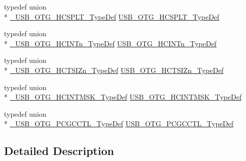 \begin{DoxyCompactItemize}
\item 
typedef union \\*
\hyperlink{union___u_s_b___o_t_g___h_c_s_p_l_t___type_def}{\-\_\-\-U\-S\-B\-\_\-\-O\-T\-G\-\_\-\-H\-C\-S\-P\-L\-T\-\_\-\-Type\-Def} \hyperlink{group______otg___core__registers_ga8f4ca4c1a354053dc90106d929d669d0}{U\-S\-B\-\_\-\-O\-T\-G\-\_\-\-H\-C\-S\-P\-L\-T\-\_\-\-Type\-Def}
\item 
typedef union \\*
\hyperlink{union___u_s_b___o_t_g___h_c_i_n_tn___type_def}{\-\_\-\-U\-S\-B\-\_\-\-O\-T\-G\-\_\-\-H\-C\-I\-N\-Tn\-\_\-\-Type\-Def} \hyperlink{group______otg___core__registers_ga97da6dd53ec32b3af062683201a4285f}{U\-S\-B\-\_\-\-O\-T\-G\-\_\-\-H\-C\-I\-N\-Tn\-\_\-\-Type\-Def}
\item 
typedef union \\*
\hyperlink{union___u_s_b___o_t_g___h_c_t_s_i_zn___type_def}{\-\_\-\-U\-S\-B\-\_\-\-O\-T\-G\-\_\-\-H\-C\-T\-S\-I\-Zn\-\_\-\-Type\-Def} \hyperlink{group______otg___core__registers_gaf749b7bfa1f730ccbc79ead7f6a3b2c8}{U\-S\-B\-\_\-\-O\-T\-G\-\_\-\-H\-C\-T\-S\-I\-Zn\-\_\-\-Type\-Def}
\item 
typedef union \\*
\hyperlink{union___u_s_b___o_t_g___h_c_i_n_t_m_s_k___type_def}{\-\_\-\-U\-S\-B\-\_\-\-O\-T\-G\-\_\-\-H\-C\-I\-N\-T\-M\-S\-K\-\_\-\-Type\-Def} \hyperlink{group______otg___core__registers_ga91d6bf7a46acfdf4a6507f4641ef13e8}{U\-S\-B\-\_\-\-O\-T\-G\-\_\-\-H\-C\-I\-N\-T\-M\-S\-K\-\_\-\-Type\-Def}
\item 
typedef union \\*
\hyperlink{union___u_s_b___o_t_g___p_c_g_c_c_t_l___type_def}{\-\_\-\-U\-S\-B\-\_\-\-O\-T\-G\-\_\-\-P\-C\-G\-C\-C\-T\-L\-\_\-\-Type\-Def} \hyperlink{group______otg___core__registers_gaf69be47d8ef9aa89a4a09ac8ce8e5373}{U\-S\-B\-\_\-\-O\-T\-G\-\_\-\-P\-C\-G\-C\-C\-T\-L\-\_\-\-Type\-Def}
\end{DoxyCompactItemize}


\subsection{Detailed Description}


